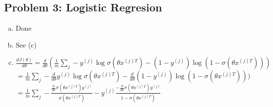 \documentclass[twoside,11pt]{article}
\theoremstyle{definition}
\begin{document}

\subsection*{Problem 3: Logistic Regresion}

\begin{enumerate}[(a)]
\item Done
\item See (c)


\item $\frac{dJ(\theta)}{d\theta} = \frac{d}{d\theta} (\frac{1}{m} \sum_{j} -y^{(j)} \log\sigma(\theta x^{(j)T}) - (1-y^{(j)}) \log(1 - \sigma(\theta x^{(j)T})))$ \\

$= \frac{1}{m} \sum_{j} -\frac{d}{d\theta}y^{(j)} \log\sigma(\theta x^{(j)T}) - \frac{d}{d\theta}(1-y^{(j)}) \log(1 - \sigma(\theta x^{(j)T})))$ \\
$= \frac{1}{m} \sum_{j} -\frac{\frac{d}{d\theta} \sigma(\theta x^{(j)T}) y^{(j)}}{\sigma(\theta x^{(j)T})} - y^{(j)} \frac{-\frac{d}{d\theta} \sigma(\theta x^{(j)T}) y^{(j)}}{1 - \sigma(\theta x^{(j)T})}$ \\

\end{enumerate}

\end{document}
